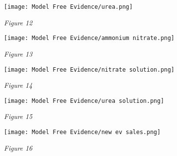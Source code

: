 \documentclass[12pt]{article}
\newenvironment{Figure}
{\par\medskip\noindent\minipage{\linewidth}}
{\endminipage\par\medskip}
\begin{document}
\begin{multicols}{2}
		
		\begin{Figure}
			\centering
			\texttt{[image: Model Free Evidence/urea.png]}
			
		\end{Figure}
		\begin{center}
			\emph{Figure 12}\\
		\end{center}
		
		
		
		\begin{Figure}
			\centering
			\texttt{[image: Model Free Evidence/ammonium nitrate.png]}
			
		\end{Figure}
		\begin{center}
			\emph{Figure 13}\\
		\end{center}
		
		
		
		\begin{Figure}
			\centering
			\texttt{[image: Model Free Evidence/nitrate solution.png]}
			
		\end{Figure}
		\begin{center}
			\emph{Figure 14}\\
		\end{center}
		
		
		
		\begin{Figure}
			\centering
			\texttt{[image: Model Free Evidence/urea solution.png]}
			
		\end{Figure}
		\begin{center}
			\emph{Figure 15}\\
		\end{center}
		
		
	\end{multicols}
	
	\newpage
	
	\begin{Figure}
		\centering
		\texttt{[image: Model Free Evidence/new ev sales.png]}
		
	\end{Figure}
	\begin{center}
		\emph{Figure 16}\\
	\end{center}
	
\end{document}
